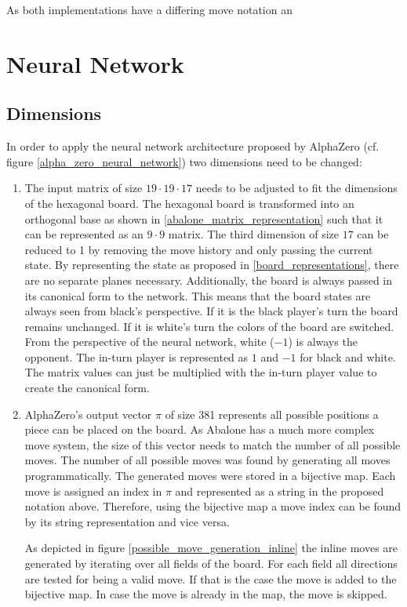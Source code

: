 As both implementations have a differing move notation an

\section{Neural Network}
\subsection{Dimensions}
In order to apply the neural network architecture proposed by AlphaZero (cf. figure \ref{alpha_zero_neural_network}) two dimensions need to be changed:
\begin{enumerate}
    \item The input matrix of size $19 \cdot 19 \cdot 17$ needs to be adjusted to fit the dimensions of the hexagonal board. The hexagonal board is transformed into an orthogonal base as shown in \ref{abalone_matrix_representation} such that it can be represented as an $9 \cdot 9$ matrix.
          The third dimension of size $17$ can be reduced to 1 by removing the move history and only passing the current state. By representing the state as proposed in \ref{board_representations}, there are no separate planes necessary. Additionally, the board is always passed in its canonical form to the network. This means that the board states are always seen from black's perspective. If it is the black player's turn the board remains unchanged. If it is white's turn the colors of the board are switched. From the perspective of the neural network, white ($-1$) is always the opponent. The in-turn player is represented as $1$ and $-1$ for black and white. The matrix values can just be multiplied with the in-turn player value to create the canonical form.
    \item AlphaZero's output vector $\pi$ of size 381 represents all possible positions a piece can be placed on the board. As Abalone has a much more complex move system, the size of this vector needs to match the number of all possible moves. The number of all possible moves was found by generating all moves programmatically. The generated moves were stored in a bijective map. Each move is assigned an index in $\pi$ and represented as a string in the proposed notation above. Therefore, using the bijective map a move index can be found by its string representation and vice versa.

          As depicted in figure \ref{possible_move_generation_inline} the inline moves are generated by iterating over all fields of the board. For each field all directions are tested for being a valid move. If that is the case the move is added to the bijective map. In case the move is already in the map, the move is skipped.


\end{enumerate}
